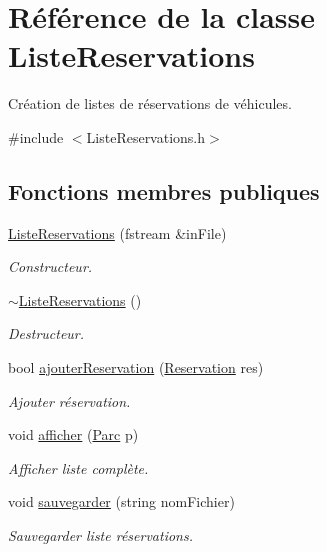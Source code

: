 \hypertarget{class_liste_reservations}{
\section{Référence de la classe ListeReservations}
\label{class_liste_reservations}
}


Création de listes de réservations de véhicules.  




{\ttfamily \#include $<$ListeReservations.h$>$}

\subsection*{Fonctions membres publiques}
\begin{DoxyCompactItemize}
\item 
\hyperlink{class_liste_reservations_a588814a2a1a844ad70e790d1cf7f3d45}{ListeReservations} (fstream \&inFile)
\begin{DoxyCompactList}\small\item\em Constructeur. \item\end{DoxyCompactList}\item 
\hyperlink{class_liste_reservations_a32f73522c4b7e1dc98dc6ed8a06e7ec6}{$\sim$ListeReservations} ()
\begin{DoxyCompactList}\small\item\em Destructeur. \item\end{DoxyCompactList}\item 
bool \hyperlink{class_liste_reservations_abc616def701c55e0643f7ace4e0dd0c5}{ajouterReservation} (\hyperlink{class_reservation}{Reservation} res)
\begin{DoxyCompactList}\small\item\em Ajouter réservation. \item\end{DoxyCompactList}\item 
void \hyperlink{class_liste_reservations_a6a199865ea417f472c46cd981bdb9e2c}{afficher} (\hyperlink{class_parc}{Parc} p)
\begin{DoxyCompactList}\small\item\em Afficher liste complète. \item\end{DoxyCompactList}\item 
void \hyperlink{class_liste_reservations_a0d55928f73787fe75e77df3fd79da52e}{sauvegarder} (string nomFichier)
\begin{DoxyCompactList}\small\item\em Sauvegarder liste réservations. \item\end{DoxyCompactList}\end{DoxyCompactItemize}


